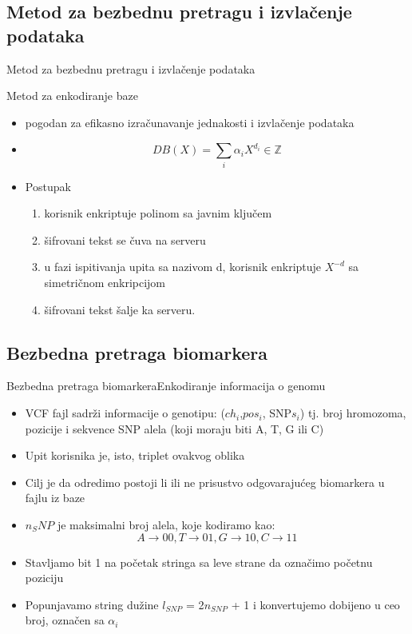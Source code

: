 \documentclass[10pt]{beamer}
\begin{document}
\subsection{Metod za bezbednu pretragu i izvlačenje podataka}
\begin{frame}{Metod za bezbednu pretragu i izvlačenje podataka}
\begin{block}{Metod za enkodiranje baze}
	\begin{itemize}
		\item pogodan za efikasno izračunavanje jednakosti i izvlačenje podataka
		\item $$DB(X) = \sum_{i} \alpha_i X^{d_i} \in \mathbb{Z}$$
		\item Postupak 
		\begin{enumerate}
			\item korisnik enkriptuje polinom sa javnim ključem
			\item šifrovani tekst se čuva na serveru
			\item u fazi ispitivanja upita sa nazivom d, korisnik enkriptuje $X^{-d}$ sa simetričnom enkripcijom
			\item šifrovani tekst šalje ka serveru.
		\end{enumerate}
	\end{itemize}
\end{block}
\end{frame}
     

\subsection{Bezbedna pretraga biomarkera}
\begin{frame}{Bezbedna pretraga biomarkera}{Enkodiranje informacija o genomu}
\begin{block}{}
\begin{itemize}
\item VCF fajl sadrži informacije o genotipu: ($ch_i$,$pos_i$, SNP$s_i$) tj. broj hromozoma, pozicije i sekvence SNP alela (koji moraju biti A, T, G ili C)
\item Upit korisnika je, isto, triplet ovakvog oblika 
\item Cilj je da odredimo postoji li ili ne prisustvo odgovarajućeg biomarkera u fajlu iz baze
\item $n_SNP$ je maksimalni broj alela, koje kodiramo kao: $$A \rightarrow 00, T \rightarrow 01, G \rightarrow 10, C \rightarrow 11$$
\item Stavljamo bit 1 na početak stringa sa leve strane da označimo početnu poziciju
\item Popunjavamo string dužine $\textit{l}_{SNP}$ = 2$n_{SNP}$ + 1 i konvertujemo dobijeno u ceo broj, označen sa $\alpha_i$
\end{itemize}
\end{block}
\end{frame}
\end{document}
